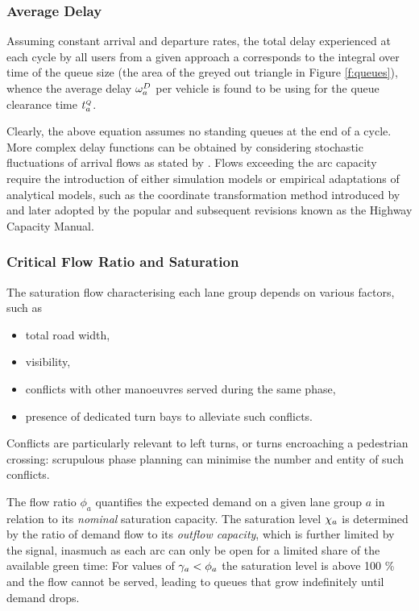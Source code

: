 \subsubsection*{Average Delay}
Assuming constant arrival and departure rates, the total delay experienced at each cycle by all users from a given approach a corresponds to the integral over time of the queue size (the area of the greyed out triangle in Figure \ref{f:queues}), whence the average delay $\omega_{a}^{D}$ per vehicle is found to be
using  for the queue clearance time $t_{a}^{\scriptscriptstyle{Q}}$.

Clearly, the above equation  assumes no standing queues at the end of a cycle. More complex delay functions can be obtained by considering stochastic fluctuations of arrival flows as stated by \cite{webster1958traffic}. 
Flows exceeding the arc capacity require the introduction of either simulation models or empirical adaptations of analytical models, such as the coordinate transformation method introduced by \cite{kimber1979traffic} and later adopted by the popular \hcm and subsequent revisions known as the Highway Capacity Manual.

\subsubsection*{Critical Flow Ratio and Saturation}
The saturation flow characterising each lane group depends on various factors, such as
\begin{itemize}
\item total road width,
\item visibility,
\item conflicts with other manoeuvres served during the same phase,
\item presence of dedicated turn bays to alleviate such conflicts.
\end{itemize} 
Conflicts are particularly relevant to left turns, or turns encroaching a pedestrian crossing: scrupulous phase planning can minimise the number and entity of such conflicts.

The flow ratio $\phi_a$ quantifies the expected demand on a given lane group $a$ in relation to its \emph{nominal} saturation capacity.
The saturation level $\chi_a$ is determined by the ratio of demand flow to its \emph{outflow capacity}, which is further limited by the signal, inasmuch as each arc can only be open for a limited share of the available green time:
For values of $\gamma_{a} < \phi_a$ the saturation level is above 100 \% and the flow cannot be served, leading to queues that grow indefinitely until demand drops.

